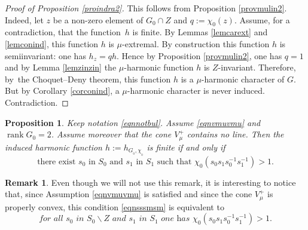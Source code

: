 \documentclass[JEP,XML,SOM,Unicode]{cedram}
\DeclareMathOperator{\rank}{rank}
\newtheorem{Prop}[Thm]{Proposition}
\theoremstyle{definition}
\newtheorem{Rem}[Thm]{Remark}
\begin{document}
\begin{proof}[Proof of Proposition \ref{proindra2}]
This follows from Proposition \ref{provmulin2}.
Indeed, let $z$ be a non-zero element of $G_0\cap Z$ and $q:=\chi_0(z)$.
Assume, for a contradiction, that the function~$h$ is finite.
By Lemmas \ref{lemcarext} and \ref{lemconind},
this function $h$ is $\mu$-extremal.
By construction this function $h$ is semiinvariant: one has
$h_z=qh$. Hence by Proposition \ref{provmulin2}, one has $q=1$
and by Lemma \ref{lemzinzin} the $\mu$-harmonic function $h$ is $Z$-invariant.
Therefore, by~the Choquet--Deny theorem, this function $h$
is a $\mu$-harmonic character of $G$.
But by Corollary \ref{corconind}, a $\mu$-harmonic character is never induced.
Contradiction.
\end{proof}

\begin{Prop}

\label{proindra3}
Keep notation \eqref{eqnnotbul}. Assume \eqref{eqnvmuvmu} and $\rank G_0=2$.
Assume moreover that the cone $V^+_\mu$ contains no line.
Then the induced harmonic function $h:=h_{G_{_0},\chi_{_0}}$ is finite if and only if
\begin{equation}
\label{eqnsssmsm}
\text{there exist $s_0$ in $S_0$ and $s_1$ in $S_1$ such that $\chi_0(s_0s_1s_0^{-1}s_1^{-1})>1$.}
\end{equation}
\end{Prop}

\begin{Rem} Even though we will not use this remark, it is interesting to notice
that, since Assumption \eqref{eqnvmuvmu} is satisfied and since
the cone $V^+_\mu$ is properly convex,
this condition \eqref{eqnsssmsm} is equivalent to\vspace*{-3pt}
\begin{equation}
\label{eqnsssmsm2}
\textit{for all $s_0$ in $S_0\smallsetminus Z$ and $s_1$ in $S_1$ one has $\chi_0(s_0s_1s_0^{-1}s_1^{-1})>1$.}
\end{equation}
\end{Rem}
\end{document}
